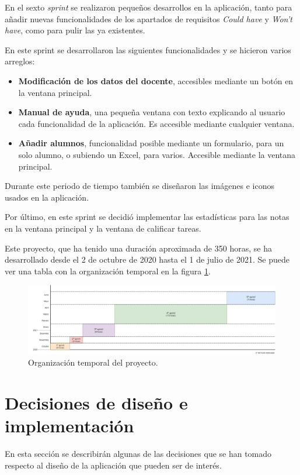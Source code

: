 En el sexto \textit{sprint} se realizaron pequeños desarrollos en la aplicación, tanto para añadir nuevas funcionalidades de los apartados de requisitos \textit{Could have} y \textit{Won't have}, como para pulir las ya existentes.

En este sprint se desarrollaron las siguientes funcionalidades y se hicieron varios arreglos:
\begin{itemize}
	\item \textbf{Modificación de los datos del docente}, accesibles mediante un botón en la ventana principal.
	\item \textbf{Manual de ayuda}, una pequeña ventana con texto explicando al usuario cada funcionalidad de la aplicación. Es accesible mediante cualquier ventana.
	\item \textbf{Añadir alumnos}, funcionalidad posible mediante un formulario, para un solo alumno, o subiendo un Excel, para varios. Accesible mediante la ventana principal.	
\end{itemize}

Durante este periodo de tiempo también se diseñaron las imágenes e iconos usados en la aplicación.

Por último, en este sprint se decidió implementar las estadísticas para las notas en la ventana principal y la ventana de calificar tareas.

Este proyecto, que ha tenido una duración aproximada de 350 horas, se ha desarrollado desde el 2 de octubre de 2020 hasta el 1 de julio de 2021. Se puede ver una tabla con la organización temporal en la figura \ref{Fig:timeline}.

\begin{figure}[h]
\centering\includegraphics[width=1\linewidth]{figs/timeline.png}
\caption{Organización temporal del proyecto.}
\label{Fig:timeline}
\end{figure}

\section{Decisiones de diseño e implementación}
En esta sección se describirán algunas de las decisiones que se han tomado respecto al diseño de la aplicación que pueden ser de interés.

